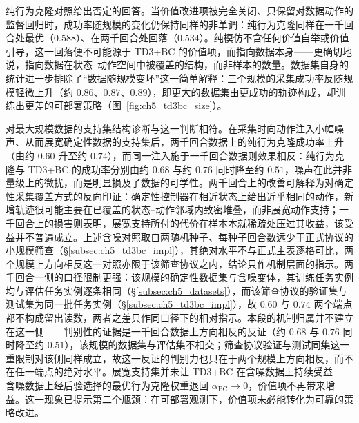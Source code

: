 纯行为克隆对照给出否定的回答。当价值改进项被完全关闭、只保留对数据动作的监督回归时，成功率随规模的变化仍保持同样的非单调：纯行为克隆同样在一千回合处最优（$0.588$）、在两千回合处回落（$0.534$）。纯模仿不含任何价值自举或价值引导，这一回落便不可能源于 TD3+BC 的价值项，而指向数据本身——更确切地说，指向数据在状态–动作空间中被覆盖的结构，而非样本的数量。数据集自身的统计进一步排除了“数据随规模变坏”这一简单解释：三个规模的采集成功率反随规模轻微上升（约 $0.86$、$0.87$、$0.89$），即更大的数据集由更成功的轨迹构成，却训练出更差的可部署策略（图~\ref{fig:ch5_td3bc_size}）。

对最大规模数据的支持集结构诊断与这一判断相符。在采集时向动作注入小幅噪声、从而展宽确定性数据的支持集后，两千回合数据上的纯行为克隆成功率上升（由约 $0.60$ 升至约 $0.74$），而同一注入施于一千回合数据则效果相反：纯行为克隆与 TD3+BC 的成功率分别由约 $0.68$ 与约 $0.76$ 同时降至约 $0.51$，噪声在此并非量级上的微扰，而是明显损及了数据的可学性。两千回合上的改善可解释为对确定性采集覆盖方式的反向印证：确定性控制器在相近状态上给出近乎相同的动作，新增轨迹很可能主要在已覆盖的状态–动作邻域内致密堆叠，而非展宽动作支持；一千回合上的损害则表明，展宽支持所付的代价在样本本就稀疏处压过其收益，该受益并不普遍成立。上述含噪对照取自两随机种子、每种子回合数远少于正式协议的小规模筛查（\S\ref{subsec:ch5_td3bc_impl}），其绝对水平不与正式主表逐格可比，两个规模上方向相反这一对照亦限于该筛查协议之内，结论只作机制层面的指示。两千回合一侧的口径限制更强：该规模的确定性数据集与含噪变体，其训练任务实例均与评估任务实例逐条相同（\S\ref{subsec:ch5_datasets}），而该筛查协议的验证集与测试集为同一批任务实例（\S\ref{subsec:ch5_td3bc_impl}），故 $0.60$ 与 $0.74$ 两个端点都不构成留出读数，两者之差只作同口径下的相对指示。本段的机制归属并不建立在这一侧——判别性的证据是一千回合数据上方向相反的反证（约 $0.68$ 与 $0.76$ 同时降至约 $0.51$），该规模的数据集与评估集不相交；筛查协议验证与测试同集这一重限制对该侧同样成立，故这一反证的判别力也只在于两个规模上方向相反，而不在任一端点的绝对水平。展宽支持集并未让 TD3+BC 在含噪数据上持续受益——含噪数据上经后验选择的最优行为克隆权重退回 $\alpha_{\mathrm{BC}}\to 0$，价值项不再带来增益。这一现象已提示第二个瓶颈：在可部署观测下，价值项未必能转化为可靠的策略改进。

